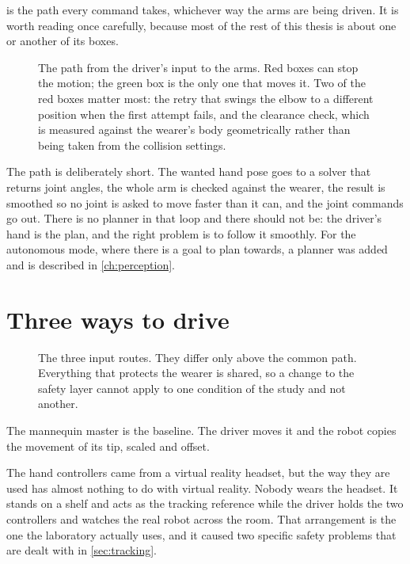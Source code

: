  is the path every command takes, whichever way the arms
are being driven. It is worth reading once carefully, because most of the rest
of this thesis is about one or another of its boxes.

\begin{figure}[htbp]
  \centering
  
  \caption[The command path]{The path from the driver's input to the arms.
  Red boxes can stop the motion; the green box is the only one that moves it.
  Two of the red boxes matter most: the retry that swings the elbow to a
  different position when the first attempt fails, and the clearance check,
  which is measured against the wearer's body geometrically rather than being
  taken from the collision settings.}
  \label{fig:datapath}
\end{figure}

The path is deliberately short. The wanted hand pose goes to a solver that
returns joint angles, the whole arm is checked against the wearer, the result
is smoothed so no joint is asked to move faster than it can, and the joint
commands go out. There is no planner in that loop and there should not be: the
driver's hand is the plan, and the right problem is to follow it smoothly. For
the autonomous mode, where there is a goal to plan towards, a planner was
added and is described in \cref{ch:perception}.

\section{Three ways to drive}

\begin{figure}[htbp]
  \centering
  
  \caption[The three ways of driving]{The three input routes. They differ only
  above the common path. Everything that protects the wearer is shared, so a
  change to the safety layer cannot apply to one condition of the study and
  not another.}
  \label{fig:modes}
\end{figure}

The mannequin master is the baseline. The driver moves it and the robot copies
the movement of its tip, scaled and offset.

The hand controllers came from a virtual reality headset, but the way they are
used has almost nothing to do with virtual reality. Nobody wears the headset.
It stands on a shelf and acts as the tracking reference while the driver
holds the two controllers and watches the real robot across the room. That
arrangement is the one the laboratory actually uses, and it caused two
specific safety problems that are dealt with in \cref{sec:tracking}.

